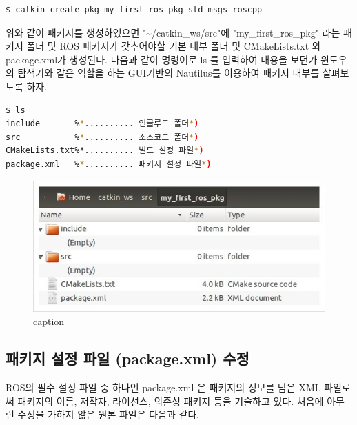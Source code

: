 \begin{lstlisting}[language=bash]
$ catkin_create_pkg my_first_ros_pkg std_msgs roscpp
\end{lstlisting}

위와 같이 패키지를 생성하였으면 "\textasciitilde/catkin\_ws/src"에 "my\_first\_ros\_pkg" 라는 패키지 폴더 및 ROS 패키지가 갖추어야할 기본 내부 폴더 및 CMakeLists.txt 와 package.xml가 생성된다. 다음과 같이 명령어로 ls 를 입력하여 내용을 보던가 윈도우의 탐색기와 같은 역할을 하는 GUI기반의 Nautilus를 이용하여 패키지 내부를 살펴보도록 하자.

\begin{lstlisting}[language=bash]
$ ls
include       %*.......... 인클루드 폴더*)
src           %*.......... 소스코드 폴더*)
CMakeLists.txt%*.......... 빌드 설정 파일*)
package.xml   %*.......... 패키지 설정 파일*)
\end{lstlisting}

\begin{figure}[h]
\centering\includegraphics[width=0.5\columnwidth]{pictures/chapter4/new_package.jpg}
\caption{caption}
\end{figure}

\subsection{패키지 설정 파일 (package.xml) 수정}

ROS의 필수 설정 파일 중 하나인 package.xml 은 패키지의 정보를 담은 XML 파일로써 패키지의 이름, 저작자, 라이선스, 의존성 패키지 등을 기술하고 있다. 처음에 아무런 수정을 가하지 않은 원본 파일은 다음과 같다.



